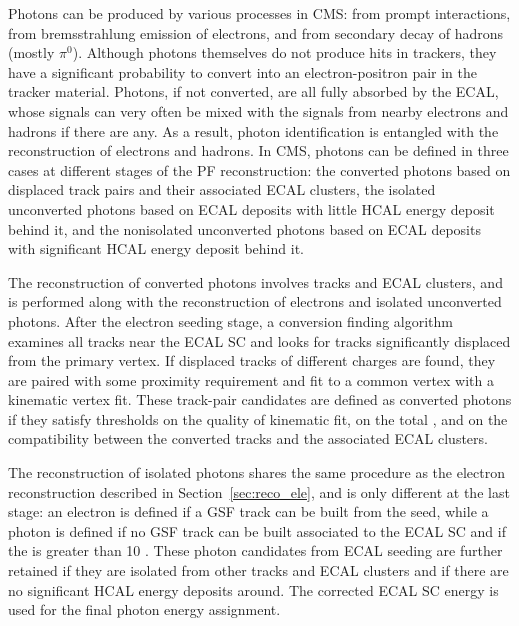 Photons can be produced by various processes in CMS: from prompt interactions, 
from bremsstrahlung emission of electrons, and from secondary decay of hadrons (mostly $\pi^{0}$).
Although photons themselves do not produce hits in trackers, 
they have a significant probability to convert into an electron-positron pair in the tracker material.
Photons, if not converted, are all fully absorbed by the ECAL,
whose signals can very often be mixed with the signals from nearby electrons and hadrons if there are any.
As a result, photon identification is entangled with the reconstruction of electrons and hadrons.
In CMS, photons can be defined in three cases at different stages of the PF reconstruction:
the converted photons based on displaced track pairs and their associated ECAL clusters,
the isolated unconverted photons based on ECAL deposits with little HCAL energy deposit behind it,
and the nonisolated unconverted photons based on ECAL deposits with significant HCAL energy deposit behind it.

The reconstruction of converted photons involves tracks and ECAL clusters, 
and is performed along with the reconstruction of electrons and isolated unconverted photons.
After the electron seeding stage, a conversion finding algorithm~\cite{2015photon} examines all tracks near the ECAL SC
and looks for tracks significantly displaced from the primary vertex.
If displaced tracks of different charges are found, they are paired with some proximity requirement 
and fit to a common vertex with a kinematic vertex fit.
These track-pair candidates are defined as converted photons if they satisfy thresholds on the quality of kinematic fit,
on the total \pt, and on the compatibility between the converted tracks and the associated ECAL clusters.

The reconstruction of isolated photons shares the same procedure as the electron reconstruction described in Section~\ref{sec:reco_ele},
and is only different at the last stage:
an electron is defined if a GSF track can be built from the seed, 
while a photon is defined if no GSF track can be built associated to the ECAL SC 
and if the \ET is greater than 10 \GeV.
These photon candidates from ECAL seeding are further retained if they are isolated from other tracks and ECAL clusters
and if there are no significant HCAL energy deposits around.
The corrected ECAL SC energy is used for the final photon energy assignment. 

